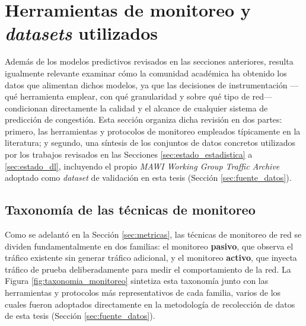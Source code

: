 \documentclass[12pt]{report}
\begin{document}
\section{Herramientas de monitoreo y \textit{datasets} utilizados}
\label{sec:estado_datos}

Además de los modelos predictivos revisados en las secciones anteriores, resulta igualmente relevante examinar cómo la comunidad académica ha obtenido los datos que alimentan dichos modelos, ya que las decisiones de instrumentación ---qué herramienta emplear, con qué granularidad y sobre qué tipo de red--- condicionan directamente la calidad y el alcance de cualquier sistema de predicción de congestión. Esta sección organiza dicha revisión en dos partes: 
primero, las herramientas y protocolos de monitoreo empleados típicamente en la literatura; y segundo, una síntesis de los conjuntos de datos concretos utilizados por los trabajos revisados en las Secciones \ref{sec:estado_estadistica} a \ref{sec:estado_dl}, incluyendo el propio \textit{MAWI Working Group Traffic Archive} adoptado como \textit{dataset} de validación en esta tesis (Sección \ref{sec:fuente_datos}).

\subsection*{Taxonomía de las técnicas de monitoreo}

Como se adelantó en la Sección \ref{sec:metricas}, las técnicas de monitoreo de red se dividen fundamentalmente en dos familias: el monitoreo \textbf{pasivo}, que observa el tráfico existente sin generar tráfico adicional, y el monitoreo \textbf{activo}, que inyecta tráfico de prueba deliberadamente para medir el comportamiento de la red. La Figura \ref{fig:taxonomia_monitoreo} sintetiza esta taxonomía junto con las herramientas y protocolos más 
representativos de cada familia, varios de los cuales fueron adoptados directamente en la metodología de recolección de datos de esta tesis (Sección \ref{sec:fuente_datos}).
\end{document}
